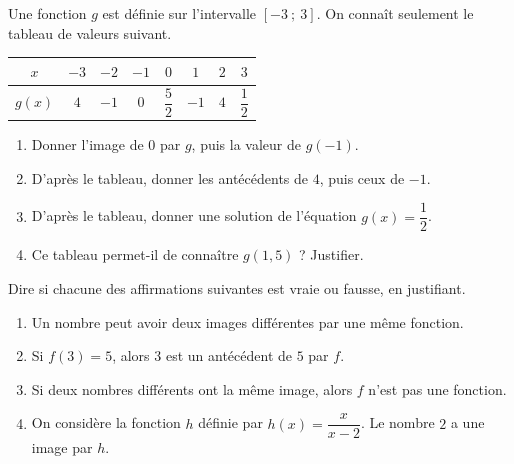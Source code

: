 \documentclass[10pt,a4paper]{article}
\begin{document}
\begin{bloc}
\begin{exo}
Une fonction \(g\) est définie sur l'intervalle \([-3\ ;\ 3]\). On connaît seulement le tableau de valeurs suivant.

\begin{center}
\renewcommand{\arraystretch}{2}
\begin{tabular}{|*{8}{c|}}
    \hline
    \(x\) & \(-3\) & \(-2\) & \(-1\) & \(0\) & \(1\) & \(2\) & \(3\) \\
    \hline
    \(g(x)\) & \(4\) & \(-1\) & \(0\) & \(\dfrac{5}{2}\) & \(-1\) & \(4\) & \(\dfrac{1}{2}\) \\
    \hline
\end{tabular}
\end{center}

\begin{enumerate}[leftmargin=*]
    \item Donner l'image de \(0\) par \(g\), puis la valeur de \(g(-1)\).
    \item D'après le tableau, donner les antécédents de \(4\), puis ceux de \(-1\).
    \item D'après le tableau, donner une solution de l'équation \(g(x)=\dfrac{1}{2}\).
    \item Ce tableau permet-il de connaître \(g(1,5)\) ? Justifier.
\end{enumerate}
\end{exo}
\end{bloc}

\begin{bloc}
\begin{exo}
Dire si chacune des affirmations suivantes est vraie ou fausse, en justifiant.
\begin{enumerate}[leftmargin=*]
    \item Un nombre peut avoir deux images différentes par une même fonction.
    \item Si \(f(3)=5\), alors \(3\) est un antécédent de \(5\) par \(f\).
    \item Si deux nombres différents ont la même image, alors \(f\) n'est pas une fonction.
    \item On considère la fonction \(h\) définie par \(h(x)=\dfrac{x}{x-2}\). Le nombre \(2\) a une image par \(h\).
\end{enumerate}
\end{exo}
\end{bloc}

\end{document}
